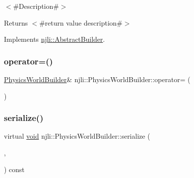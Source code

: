 $<$\#\+Description\#$>$

\begin{DoxyReturn}{Returns}
$<$\#return value description\#$>$ 
\end{DoxyReturn}


Implements \mbox{\hyperlink{classnjli_1_1_abstract_builder_a3e6e553e06d1ca30517ad5fb0bd4d000}{njli\+::\+Abstract\+Builder}}.

\mbox{\label{classnjli_1_1_physics_world_builder_a9a9892f6f6dd6ae309f90d79b602caba}} 
\subsubsection{\texorpdfstring{operator=()}{operator=()}}
{\footnotesize\ttfamily \mbox{\hyperlink{classnjli_1_1_physics_world_builder}{Physics\+World\+Builder}}\& njli\+::\+Physics\+World\+Builder\+::operator= (\begin{DoxyParamCaption}\item[{const \mbox{\hyperlink{classnjli_1_1_physics_world_builder}{Physics\+World\+Builder}} \&}]{ }\end{DoxyParamCaption})\hspace{0.3cm}{\ttfamily [protected]}}

\mbox{\label{classnjli_1_1_physics_world_builder_a795847019f3bea770fcd58c2e3225e7c}} 
\subsubsection{\texorpdfstring{serialize()}{serialize()}}
{\footnotesize\ttfamily virtual \mbox{\hyperlink{_thread_8h_af1e856da2e658414cb2456cb6f7ebc66}{void}} njli\+::\+Physics\+World\+Builder\+::serialize (\begin{DoxyParamCaption}\item[{\mbox{\hyperlink{_thread_8h_af1e856da2e658414cb2456cb6f7ebc66}{void}} $\ast$}]{,  }\item[{bt\+Serializer $\ast$}]{ }\end{DoxyParamCaption}) const\hspace{0.3cm}{\ttfamily [virtual]}}

